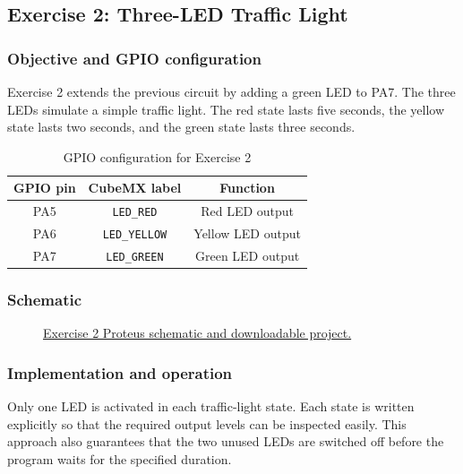 \documentclass[a4paper]{article}
\newcommand{\exerciseTwoURL}{https://github.com/USERNAME/REPOSITORY}
\begin{document}
\subsection{Exercise 2: Three-LED Traffic Light}

\subsubsection{Objective and GPIO configuration}

Exercise 2 extends the previous circuit by adding a green LED to PA7. The three
LEDs simulate a simple traffic light. The red state lasts five seconds, the
yellow state lasts two seconds, and the green state lasts three seconds.

\begin{table}[H]
    \centering
    \caption{GPIO configuration for Exercise 2}
    \label{tab:exercise2-gpio}
    \begin{tabular}{ccc}
        \toprule
        \textbf{GPIO pin} & \textbf{CubeMX label} & \textbf{Function} \\
        \midrule
        PA5 & \texttt{LED\_RED} & Red LED output \\
        PA6 & \texttt{LED\_YELLOW} & Yellow LED output \\
        PA7 & \texttt{LED\_GREEN} & Green LED output \\
        \bottomrule
    \end{tabular}
\end{table}

\subsubsection{Schematic}

\begin{figure}[H]
    \centering
    \caption{\href{\exerciseTwoURL}{Exercise 2 Proteus schematic and downloadable project.}}
    \label{fig:exercise2-schematic}
\end{figure}

\subsubsection{Implementation and operation}

Only one LED is activated in each traffic-light state. Each state is written
explicitly so that the required output levels can be inspected easily. This
approach also guarantees that the two unused LEDs are switched off before the
program waits for the specified duration.
\end{document}
